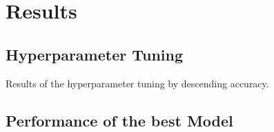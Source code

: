 


\section{Results}
\label{section3}

\subsection{Hyperparameter Tuning}

\begin{table}[ht]
    \centering
    \caption{Results of the hyperparameter tuning by descending accuracy.}
    \label{tab:hyperparameters}

    

\end{table}

\subsection{Performance of the best Model}
